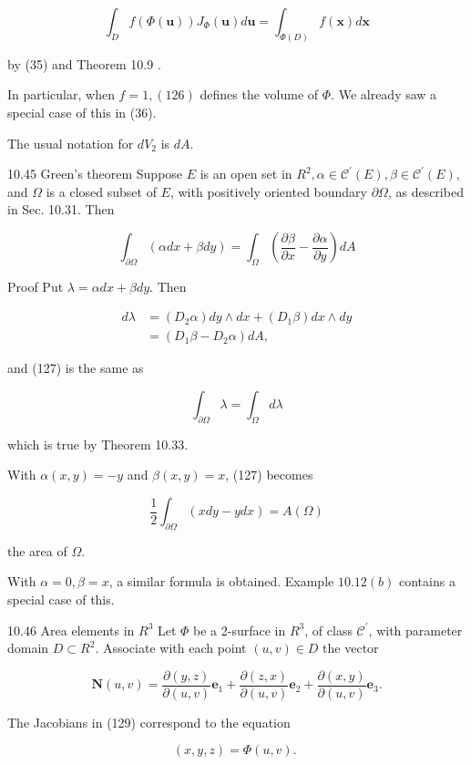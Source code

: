 \documentclass[10pt]{article}
\begin{document}
$$
\int_{D} f(\Phi(\mathbf{u})) J_{\Phi}(\mathbf{u}) d \mathbf{u}=\int_{\Phi(D)} f(\mathbf{x}) d \mathbf{x}
$$

by (35) and Theorem 10.9 .

In particular, when $f=1,(126)$ defines the volume of $\Phi$. We already saw a special case of this in (36).

The usual notation for $d V_{2}$ is $d A$.

10.45 Green's theorem Suppose $E$ is an open set in $R^{2}, \alpha \in \mathscr{C}^{\prime}(E), \beta \in \mathscr{C}^{\prime}(E)$, and $\Omega$ is a closed subset of $E$, with positively oriented boundary $\partial \Omega$, as described in Sec. 10.31. Then

$$
\int_{\partial \Omega}(\alpha d x+\beta d y)=\int_{\Omega}\left(\frac{\partial \beta}{\partial x}-\frac{\partial \alpha}{\partial y}\right) d A
$$

Proof Put $\lambda=\alpha d x+\beta d y$. Then

$$
\begin{aligned}
d \lambda & =\left(D_{2} \alpha\right) d y \wedge d x+\left(D_{1} \beta\right) d x \wedge d y \\
& =\left(D_{1} \beta-D_{2} \alpha\right) d A,
\end{aligned}
$$

and (127) is the same as

$$
\int_{\partial \Omega} \lambda=\int_{\Omega} d \lambda
$$

which is true by Theorem 10.33.

With $\alpha(x, y)=-y$ and $\beta(x, y)=x$, (127) becomes

$$
\frac{1}{2} \int_{\partial \Omega}(x d y-y d x)=A(\Omega)
$$

the area of $\Omega$.

With $\alpha=0, \beta=x$, a similar formula is obtained. Example $10.12(b)$ contains a special case of this.

10.46 Area elements in $R^{3}$ Let $\Phi$ be a 2-surface in $R^{3}$, of class $\mathscr{C}^{\prime}$, with parameter domain $D \subset R^{2}$. Associate with each point $(u, v) \in D$ the vector

$$
\mathbf{N}(u, v)=\frac{\partial(y, z)}{\partial(u, v)} \mathbf{e}_{1}+\frac{\partial(z, x)}{\partial(u, v)} \mathbf{e}_{2}+\frac{\partial(x, y)}{\partial(u, v)} \mathbf{e}_{3} .
$$

The Jacobians in (129) correspond to the equation

$$
(x, y, z)=\Phi(u, v) \text {. }
$$
\end{document}
